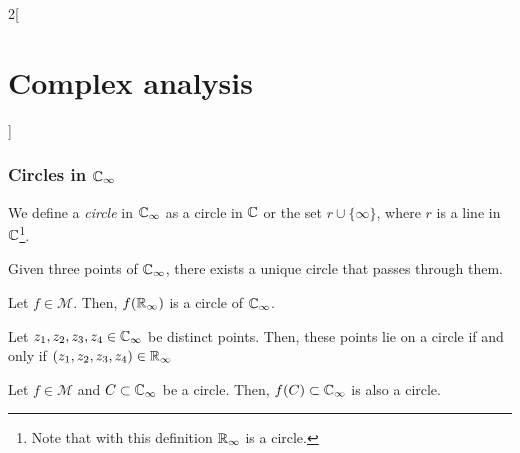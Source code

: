 \documentclass[../../../main.tex]{subfiles}
\begin{document}
\begin{multicols}{2}[\section{Complex analysis}]
  \subsubsection{Circles in \texorpdfstring{$\mathbb{C}_\infty$}{Coo}}
  \begin{definition}
    We define a \emph{circle} in $\mathbb{C}_\infty$ as a circle in $\mathbb{C}$ or the set $r\cup\{\infty\}$, where $r$ is a line in $\mathbb{C}$\footnote{Note that with this definition $\mathbb{R}_\infty$ is a circle.}.
  \end{definition}
  \begin{proposition}
    Given three points of $\mathbb{C}_\infty$, there exists a unique circle that passes through them.
  \end{proposition}
  \begin{proposition}
    Let $f\in\mathcal{M}$. Then, $f(\mathbb{R}_\infty)$ is a circle of $\mathbb{C}_\infty$.
  \end{proposition}
  \begin{proposition}
    Let $z_1,z_2,z_3,z_4\in\mathbb{C}_\infty$ be distinct points. Then, these points lie on a circle if and only if $(z_1,z_2,z_3,z_4)\in\mathbb{R}_\infty$
  \end{proposition}
  \begin{theorem}
    Let $f\in\mathcal{M}$ and $C\subset\mathbb{C}_\infty$ be a circle. Then, $f(C)\subset\mathbb{C}_\infty$ is also a circle.
  \end{theorem}

\end{multicols}
\end{document}
